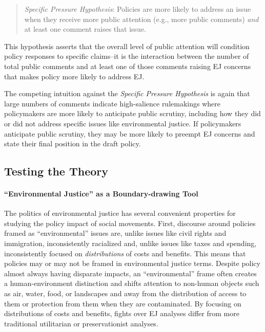 \documentclass[
      12pt,
        ]{article}
\begin{document}
\begin{quote}
\emph{Specific Pressure Hypothesis}: Policies are more likely to address an issue when they receive more public attention (e.g., more public comments) \emph{and} at least one comment raises that issue.
\end{quote}

This hypothesis asserts that the overall level of public attention will condition policy responses to specific claims--it is the interaction between the number of total public comments and at least one of those comments raising EJ concerns that makes policy more likely to address EJ.

The competing intuition against the \emph{Specific Pressure Hypothesis} is again that large numbers of comments indicate high-salience rulemakings where policymakers are more likely to anticipate public scrutiny, including how they did or did not address specific issues like environmental justice. If policymakers anticipate public scrutiny, they may be more likely to preempt EJ concerns and state their final position in the draft policy.

\hypertarget{testing-the-theory}{%
\subsection{Testing the Theory}\label{testing-the-theory}}

\hypertarget{environmental-justice-as-a-boundary-drawing-tool}{%
\paragraph{``Environmental Justice'' as a Boundary-drawing Tool}\label{environmental-justice-as-a-boundary-drawing-tool}}

The politics of environmental justice has several convenient properties for studying the policy impact of social movements. First, discourse around policies framed as ``environmental'' issues are, unlike issues like civil
rights and immigration, inconsistently racialized and, unlike issues
like taxes and spending, inconsistently focused on \emph{distributions} of
costs and benefits. This means that policies may or may not be framed in environmental justice terms. Despite policy almost always having disparate impacts, an ``environmental'' frame often creates a human-environment distinction and shifts attention to non-human objects such as air, water, food, or landscapes and away from the distribution of access to them or
protection from them when they are contaminated. By focusing on distributions of costs and benefits, fights over EJ analyses differ from more traditional utilitarian or preservationist analyses.
\end{document}
